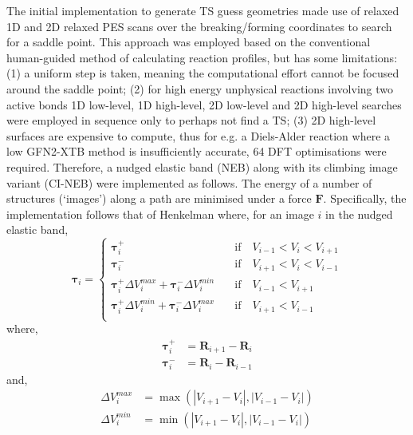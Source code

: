 \documentclass[../../main.tex]{subfiles}
\begin{document}
The initial \ade implementation to generate TS guess geometries made use of relaxed 1D and 2D relaxed PES scans over the breaking/forming coordinates to search for a saddle point. This approach was employed based on the conventional human-guided method of calculating reaction profiles, but has some limitations: (1) a uniform step is taken, meaning the computational effort cannot be focused around the saddle point; (2) for high energy unphysical reactions involving two active bonds 1D low-level, 1D high-level, 2D low-level and 2D high-level searches were employed in sequence only to perhaps not find a TS; (3) 2D high-level surfaces are expensive to compute, thus for e.g. a Diels-Alder reaction where a low GFN2-XTB method is insufficiently accurate, 64 DFT optimisations were required. Therefore, a nudged elastic band (NEB)\cite{NEB1998} along with its climbing image variant (CI-NEB)\cite{Henkelman2000CINEB} were implemented as follows. The energy of a number of structures (`images') along a path are minimised under a force $\boldsymbol{F}$. Specifically, the implementation follows that of Henkelman\cite{Henkelman2000NEB} where, for an image $i$ in the nudged elastic band,
\begin{equation}
	\boldsymbol{\tau}_i = 
	\begin{cases}
		\boldsymbol{\tau}_i^+ &\quad\text{if}\quad V_{i-1} < V_i < V_{i+1} \\
		\boldsymbol{\tau}_i^- &\quad\text{if}\quad V_{i+1} < V_i < V_{i-1} \\
		\boldsymbol{\tau}_i^+\Delta V_i^{max} + \boldsymbol{\tau}_i^-\Delta V_i^{min} &\quad\text{if}\quad V_{i-1} <  V_{i+1} \\
		\boldsymbol{\tau}_i^+\Delta V_i^{min} + \boldsymbol{\tau}_i^-\Delta V_i^{max} &\quad\text{if}\quad V_{i+1} < V_{i-1} \\
	\end{cases}
\end{equation}
where,
\begin{equation}
	\begin{aligned}
		\boldsymbol{\tau}_i^+ &= \boldsymbol{R}_{i+1} - \boldsymbol{R}_i \\
		\boldsymbol{\tau}_i^- &= \boldsymbol{R}_{i} - \boldsymbol{R}_{i-1}
	\end{aligned}
\end{equation}
and,
\begin{equation}
	\begin{aligned}
		\Delta V_i^{max} &= \max(|V_{i+1} - V_i|, |V_{i-1} - V_i|) \\
		\Delta V_i^{min} &= \min(|V_{i+1} - V_i|, |V_{i-1} - V_i|)
	\end{aligned}
\end{equation}
\end{document}
